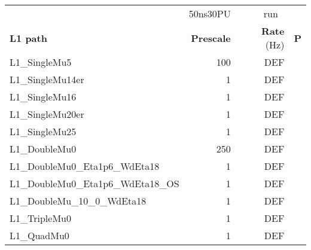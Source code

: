   \begin{tabular}{|l|r|r|r|}
    \hline
    & 50ns30PU & \multicolumn{2}{c|}{run}  \\
    \textbf{L1 path} & \textbf{Prescale}  & \textbf{Rate} (\si{Hz}) & \textbf{P} \\
    \hline
    \rowcolor{mygreen0} L1\_SingleMu5 & 100 & DEF \\
    \rowcolor{mygreen0} L1\_SingleMu14er  & 1 & DEF \\
    \rowcolor{mygreen0} L1\_SingleMu16  & 1 & DEF \\
    \rowcolor{mygreen0} L1\_SingleMu20er & 1 & DEF \\
    \rowcolor{mygreen0} L1\_SingleMu25  & 1 & DEF \\
    \hline
    \rowcolor{myyellow} L1\_DoubleMu0  & 250 & DEF \\
    \rowcolor{myyellow} L1\_DoubleMu0\_Eta1p6\_WdEta18 & 1 & DEF \\
    \rowcolor{myyellow} L1\_DoubleMu0\_Eta1p6\_WdEta18\_OS  & 1 & DEF \\
    \rowcolor{myyellow} L1\_DoubleMu\_10\_0\_WdEta18 & 1 & DEF \\
    \hline
    \rowcolor{myred0} L1\_TripleMu0 & 1 & DEF \\
    \hline
    \rowcolor{mypurple} L1\_QuadMu0 & 1 & DEF \\
    \hline
  \end{tabular}
